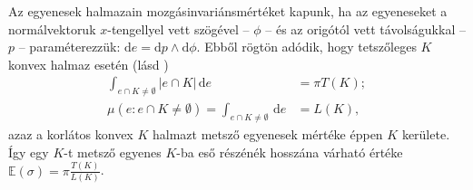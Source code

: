 \documentclass[DIV=15,appendixprefix]{scrreprt}
\theoremstyle{definition}
\theoremstyle{remark}
\newcommand{\mean}{\mathbb{E}}
\begin{document}
Az egyenesek halmazain mozgásinvariánsmértéket kapunk, ha az egyeneseket a
normálvektoruk $ x $-tengellyel vett szögével -- $ \phi $ -- és az origótól vett távolságukkal
-- $ p $ -- paraméterezzük: $ \mathrm{ d } e =  \mathrm{ d }p \wedge \mathrm{ d } \phi $. Ebből
rögtön adódik, hogy tetszőleges $ K $ konvex halmaz esetén (lásd \cite[29--30.~oldal]{Santalo})
\begin{align*}
	\int_{ e \cap K \neq \emptyset } \left| e \cap K \right| \, \mathrm{ d } e &= \pi T \left( K
	\right);\\
	\mu \left( e \colon e \cap K \neq \emptyset \right) = \int_{ e \cap K \neq \emptyset } \,
	\mathrm{ d } e &= L \left( K \right),
\end{align*}
azaz a korlátos konvex $ K $ halmazt metsző egyenesek mértéke éppen $ K $ kerülete. Így egy $ K $-t
metsző egyenes $ K $-ba eső részénék hosszána várható értéke $ \mean \left( \sigma \right)  = \pi
\frac{ T \left( K \right) }{ L \left( K  \right) } $.
\end{document}
